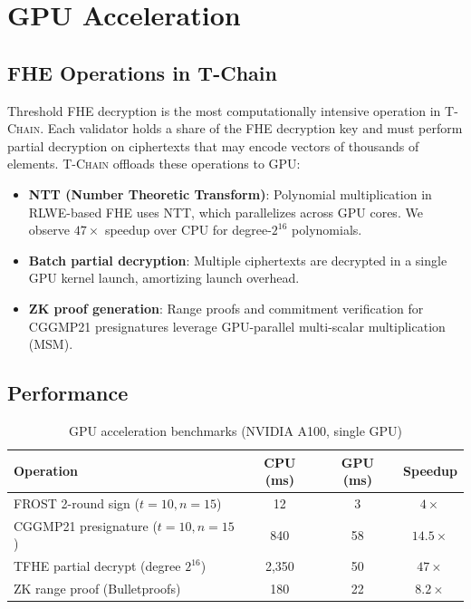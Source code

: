 \documentclass[11pt,letterpaper]{article}
\theoremstyle{definition}
\theoremstyle{remark}
\newcommand{\TChain}{\textsc{T-Chain}}
\begin{document}
\section{GPU Acceleration}
\label{sec:gpu}

\subsection{FHE Operations in T-Chain}

Threshold FHE decryption is the most computationally intensive operation in \TChain{}. Each validator holds a share of the FHE decryption key and must perform partial decryption on ciphertexts that may encode vectors of thousands of elements. \TChain{} offloads these operations to GPU:

\begin{itemize}
\item \textbf{NTT (Number Theoretic Transform)}: Polynomial multiplication in RLWE-based FHE uses NTT, which parallelizes across GPU cores. We observe $47\times$ speedup over CPU for degree-$2^{16}$ polynomials.
\item \textbf{Batch partial decryption}: Multiple ciphertexts are decrypted in a single GPU kernel launch, amortizing launch overhead.
\item \textbf{ZK proof generation}: Range proofs and commitment verification for CGGMP21 presignatures leverage GPU-parallel multi-scalar multiplication (MSM).
\end{itemize}

\subsection{Performance}

\begin{table}[h]
\centering
\begin{tabular}{lccc}
\toprule
\textbf{Operation} & \textbf{CPU (ms)} & \textbf{GPU (ms)} & \textbf{Speedup} \\
\midrule
FROST 2-round sign ($t{=}10, n{=}15$) & 12 & 3 & $4\times$ \\
CGGMP21 presignature ($t{=}10, n{=}15$) & 840 & 58 & $14.5\times$ \\
TFHE partial decrypt (degree $2^{16}$) & 2,350 & 50 & $47\times$ \\
ZK range proof (Bulletproofs) & 180 & 22 & $8.2\times$ \\
\bottomrule
\end{tabular}
\caption{GPU acceleration benchmarks (NVIDIA A100, single GPU)}
\label{tab:gpu}
\end{table}
\end{document}
